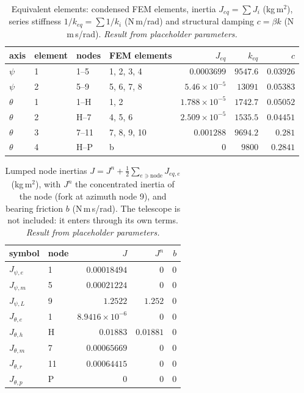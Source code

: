 \documentclass[10pt,a4paper]{article}
\numberwithin{equation}{section}
\begin{document}
\begin{table}[H]\centering\small
\caption{Equivalent elements: condensed FEM elements, inertia $J_{eq} = \sum J_i$ (kg\,m$^2$), series stiffness $1/k_{eq} = \sum 1/k_i$ (N\,m/rad) and structural damping $c = \beta k$ (N\,m\,s/rad). \emph{Result from placeholder parameters.}}\label{tab:lump_elements}
\begin{tabular}{llllrrr}\toprule
axis & element & nodes & FEM elements & $J_{eq}$ & $k_{eq}$ & $c$ \\ \midrule
$\psi$ & 1 & 1--5 & 1, 2, 3, 4 & $0.0003699$ & $9547.6$ & $0.03926$ \\
$\psi$ & 2 & 5--9 & 5, 6, 7, 8 & $5.46\times10^{-5}$ & $13091$ & $0.05383$ \\
$\theta$ & 1 & 1--H & 1, 2 & $1.788\times10^{-5}$ & $1742.7$ & $0.05052$ \\
$\theta$ & 2 & H--7 & 4, 5, 6 & $2.509\times10^{-5}$ & $1535.5$ & $0.04451$ \\
$\theta$ & 3 & 7--11 & 7, 8, 9, 10 & $0.001288$ & $9694.2$ & $0.281$ \\
$\theta$ & 4 & H--P & b & $0$ & $9800$ & $0.2841$ \\
\bottomrule\end{tabular}\end{table}
\begin{table}[H]\centering\small
\caption{Lumped node inertias $J = J^n + \tfrac12\sum_{e\ni\text{node}}J_{eq,e}$ (kg\,m$^2$), with $J^n$ the concentrated inertia of the node (fork at azimuth node 9), and bearing friction $b$ (N\,m\,s/rad). The telescope is not included: it enters through its own terms. \emph{Result from placeholder parameters.}}\label{tab:lump_nodes}
\begin{tabular}{llrrr}\toprule
symbol & node & $J$ & $J^n$ & $b$ \\ \midrule
$J_{\psi,e}$ & 1 & $0.00018494$ & $0$ & $0$ \\
$J_{\psi,m}$ & 5 & $0.00021224$ & $0$ & $0$ \\
$J_{\psi,L}$ & 9 & $1.2522$ & $1.252$ & $0$ \\
$J_{\theta,e}$ & 1 & $8.9416\times10^{-6}$ & $0$ & $0$ \\
$J_{\theta,h}$ & H & $0.01883$ & $0.01881$ & $0$ \\
$J_{\theta,m}$ & 7 & $0.00065669$ & $0$ & $0$ \\
$J_{\theta,r}$ & 11 & $0.00064415$ & $0$ & $0$ \\
$J_{\theta,p}$ & P & $0$ & $0$ & $0$ \\
\bottomrule\end{tabular}\end{table}
\end{document}
